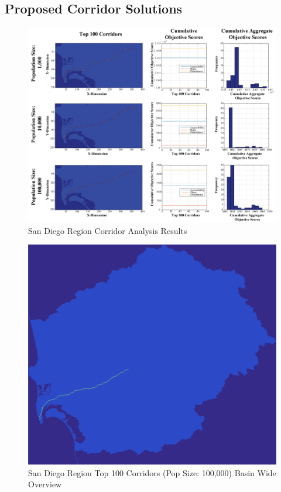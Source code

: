     \subsection{Proposed Corridor Solutions}
    
        \begin{figure}[!h]
            \begin{center}
            \includegraphics[width=6in]{figures/SanDiego_PathwayResults.png}   
            \caption{San Diego Region Corridor Analysis Results}
            \label{fig:SDresults}
            \end{center}
        \end{figure}

        \begin{figure}[!h]
            \begin{center}
            \includegraphics[width=5.5in]{figures/SanDiego_PathwayLarge.png}   
            \caption{San Diego Region Top 100 Corridors (Pop Size: 100,000) Basin Wide Overview}
            \label{fig:SDsolutionOverview}
            \end{center}
        \end{figure}
    
